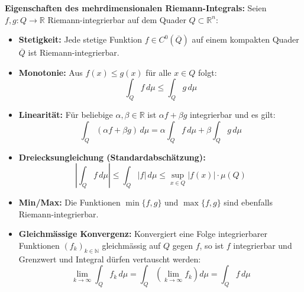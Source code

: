 \begin{theorem}
    \textbf{Eigenschaften des mehrdimensionalen Riemann-Integrals:}
    Seien $f, g: Q \to \mathbb{R}$ Riemann-integrierbar auf dem Quader $Q \subset \mathbb{R}^n$:
    \begin{itemize}
        \item \textbf{Stetigkeit:} Jede stetige Funktion $f \in C^0(\overline{Q})$ auf einem kompakten Quader $\overline{Q}$ ist Riemann-integrierbar.
        \item \textbf{Monotonie:} Aus $f(x) \le g(x)$ für alle $x \in Q$ folgt:
        $$ \int_Q f \, d\mu \le \int_Q g \, d\mu $$
        \item \textbf{Linearität:} Für beliebige $\alpha, \beta \in \mathbb{R}$ ist $\alpha f + \beta g$ integrierbar und es gilt:
        $$ \int_Q (\alpha f + \beta g) \, d\mu = \alpha \int_Q f \, d\mu + \beta \int_Q g \, d\mu $$
        \item \textbf{Dreiecksungleichung (Standardabschätzung):}
        $$ \left|\int_Q f \, d\mu\right| \le \int_Q |f| \, d\mu \le \sup_{x \in Q} |f(x)| \cdot \mu(Q) $$
        \item \textbf{Min/Max:} Die Funktionen $\min\{f, g\}$ und $\max\{f, g\}$ sind ebenfalls Riemann-integrierbar.
        \item \textbf{Gleichmässige Konvergenz:} Konvergiert eine Folge integrierbarer Funktionen $(f_k)_{k\in\mathbb{N}}$ gleichmässig auf $Q$ gegen $f$, so ist $f$ integrierbar und Grenzwert und Integral dürfen vertauscht werden:
        $$ \lim_{k\to\infty} \int_Q f_k \, d\mu = \int_Q \left( \lim_{k\to\infty} f_k \right) d\mu = \int_Q f \, d\mu $$
    \end{itemize}
\end{theorem}